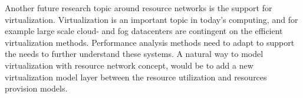 Another future research topic around resource networks is the support for virtualization. Virtualization is an important topic in today's computing, and for example large scale cloud- and fog datacenters are contingent on the efficient virtualization methods. Performance analysis methods need to adapt to support the needs to further understand these systems. A natural way to model virtualization with resource network concept, would be to add a new virtualization model layer between the resource utilization and resources provision models.

